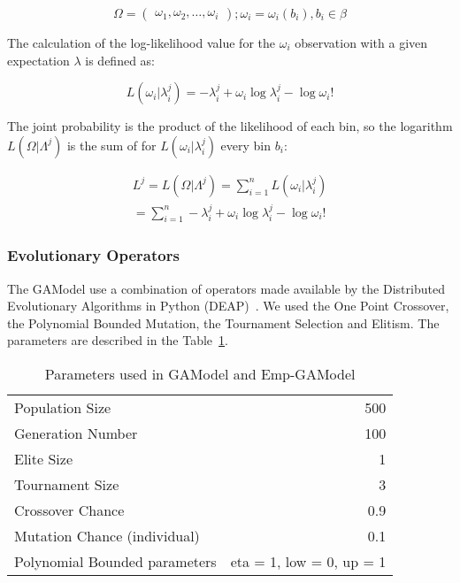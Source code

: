 \begin{equation}
\Omega = 
\begin{pmatrix}
\omega_1,
\omega_2,
\hdots,
\omega_i
\end{pmatrix}
;\omega_i =\omega_i(b_i),b_i \in \beta
\end{equation}

The calculation of the log-likelihood value for the $\omega_i$
observation with a given expectation $\lambda$ is defined as:


\begin{equation}
L(\omega_i|\lambda_i^j) = -\lambda_i^j + \omega_i\log\lambda_i^j - \log\omega_i!
\end{equation}

The joint probability is the product of the likelihood of each bin, so the logarithm $L(\Omega|\Lambda^j)$ is the sum of for
$L(\omega_i|\lambda_i^j)$ every bin $b_i$:

\begin{equation}\label{log-like}
\begin{split}
L^j = L(\Omega|\Lambda^j) = \sum_{i=1}^{n}L(\omega_i|\lambda_i^j)  \\
= \sum_{i=1}^{n} -\lambda_i^j + \omega_i\log\lambda_i^j - \log\omega_i!  
\end{split}
\end{equation}

\subsubsection{Evolutionary Operators}\label{gaOperators}
The GAModel use a combination of operators made available by the Distributed Evolutionary Algorithms in Python (DEAP)~\cite{DeRainville}. We used the One Point Crossover, the Polynomial Bounded Mutation, the Tournament Selection and Elitism. The parameters are described in the Table~\ref{GAParameters5.1}.

\begin{table}[H]
	\caption{Parameters used in GAModel and Emp-GAModel}
	\label{GAParameters5.1}
	\begin{center}
		\begin{tabular}{|l|r|}
			\hline
			Population Size & 500\\
			Generation Number & 100\\
			Elite Size & 1\\
			Tournament Size & 3\\
			Crossover Chance & 0.9\\
			Mutation Chance (individual) & 0.1\\
			Polynomial Bounded parameters & eta = 1, low = 0, up = 1\\
			\hline    
		\end{tabular}
	\end{center}
\end{table}


